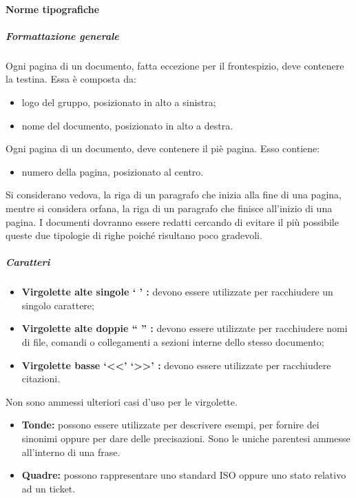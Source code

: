 \documentclass[../NormeProgetto.tex]{subfiles}
\begin{document}
	\paragraph{Norme tipografiche} \label{sec:Norme tipografiche}
		\subparagraph{Formattazione generale}
			Ogni pagina di un documento, fatta eccezione per il frontespizio, deve contenere la testina. Essa è composta da:
			\begin{itemize}
				\item logo del gruppo, posizionato in alto a sinistra;
				\item nome del documento, posizionato in alto a destra.
			\end{itemize}
			Ogni pagina di un documento, deve contenere il piè pagina. Esso contiene:
			\begin{itemize}
				\item numero della pagina, posizionato al centro.
			\end{itemize}
			Si considerano vedova, la riga di un paragrafo che inizia alla fine di una pagina, mentre si considera orfana, la riga di un paragrafo che finisce all'inizio di una pagina. I documenti dovranno essere redatti cercando di evitare il più possibile queste due tipologie di righe poiché risultano poco gradevoli. 
		\subparagraph{Caratteri}
			
			
			\begin{itemize}
				\item \textbf{Virgolette alte singole ` ' :} devono essere utilizzate per racchiudere un singolo carattere;
				\item \textbf{Virgolette alte doppie `` '' :} devono essere utilizzate per racchiudere nomi di file, comandi o collegamenti a sezioni interne dello stesso documento;
				\item \textbf{Virgolette basse `<<' `>>' :} devono essere utilizzate per racchiudere citazioni.
			\end{itemize}
			Non sono ammessi ulteriori casi d'uso per le virgolette.
			
			
			\begin{itemize}
				\item \textbf{Tonde:} possono essere utilizzate per descrivere esempi, per fornire dei sinonimi oppure per dare delle precisazioni. Sono le uniche parentesi ammesse all'interno di una frase.
				\item \textbf{Quadre:} possono rappresentare uno standard ISO oppure uno stato relativo ad un ticket. 
			\end{itemize}
			
\end{document}
